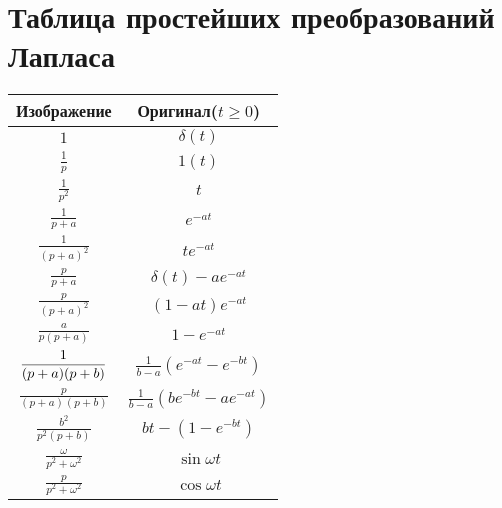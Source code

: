 \documentclass[a4paper,14pt]{extarticle}
\theoremstyle{definition}
\begin{document}



\tableofcontents
\newpage

\section{Таблица простейших преобразований Лапласа}
\begin{center}
\renewcommand{\arraystretch}{1.7}
\begin{tabular}{| c | c |}
	\hline
	Изображение                         & Оригинал($\displaystyle t\geq0$)              \\[0.9em] \hline
	$\displaystyle1$			                                & $\displaystyle\delta(t)$                     \\ \hline
	$\displaystyle\frac1p$	                          & $\displaystyle1(t)$                          \\[0.9em] \hline
	$\displaystyle\frac{1}{p^2}$                     & $\displaystyle t$                              \\[0.9em] \hline
	$\displaystyle\frac{1}{p+a}$                     & $\displaystyle e^{-at}$                       \\[0.9em] \hline
	$\displaystyle\frac{1}{(p+a)^2}$                 & $\displaystyle te^{-at}$                      \\[0.9em] \hline
	$\displaystyle\frac{p}{p+a}$                     & $\displaystyle\delta(t)-ae^{-at}$            \\[0.9em] \hline
	$\displaystyle\frac{p}{(p+a)^2}$                 & $\displaystyle(1-at) e^{-at}$                \\[0.9em] \hline
	$\displaystyle\frac{a}{p(p+a)}$                  & $\displaystyle1-e^{-at}$                     \\[0.9em] \hline
	$\displaystyle\displaystyle\frac{1}{(p+a)(p+b)}$ & $\displaystyle\frac{1}{b-a} (e^{-at} -e^{-bt} ) $   \\[0.9em] \hline
	$\displaystyle\frac{p}{(p+a)(p+b)}$              & $\displaystyle\frac{1}{b-a} (be^{-bt} -ae^{-at} ) $ \\[0.9em] \hline
	$\displaystyle\frac{b^2}{p^2(p+b)}$              & $\displaystyle bt-(1-e^{-bt})$                \\[0.9em] \hline
	$\displaystyle\frac{\omega}{p^2+\omega^2}$       & $\displaystyle\sin{\omega t}$                \\[0.9em] \hline
	$\displaystyle\frac{p}{p^2+\omega^2}$            & $\displaystyle\cos{\omega t}$ 	            \\[0.9em] \hline
\end{tabular}
\end{center}
\newpage
\end{document}
